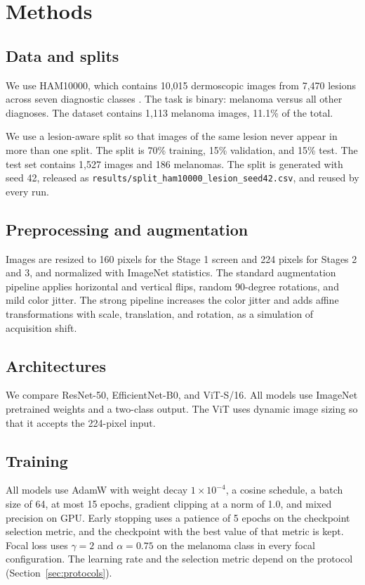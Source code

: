 \section{Methods}

\subsection{Data and splits}

We use HAM10000, which contains 10,015 dermoscopic images from 7,470 lesions across seven diagnostic classes \citep{tschandl2018ham10000}. The task is binary: melanoma versus all other diagnoses. The dataset contains 1,113 melanoma images, 11.1\% of the total.

We use a lesion-aware split so that images of the same lesion never appear in more than one split. The split is 70\% training, 15\% validation, and 15\% test. The test set contains 1,527 images and 186 melanomas. The split is generated with seed 42, released as \texttt{results/split\_ham10000\_lesion\_seed42.csv}, and reused by every run.

\subsection{Preprocessing and augmentation}

Images are resized to 160 pixels for the Stage 1 screen and 224 pixels for Stages 2 and 3, and normalized with ImageNet statistics. The standard augmentation pipeline applies horizontal and vertical flips, random 90-degree rotations, and mild color jitter. The strong pipeline increases the color jitter and adds affine transformations with scale, translation, and rotation, as a simulation of acquisition shift.

\subsection{Architectures}

We compare ResNet-50, EfficientNet-B0, and ViT-S/16. All models use ImageNet pretrained weights and a two-class output. The ViT uses dynamic image sizing so that it accepts the 224-pixel input.

\subsection{Training}

All models use AdamW with weight decay $1\times10^{-4}$, a cosine schedule, a batch size of 64, at most 15 epochs, gradient clipping at a norm of 1.0, and mixed precision on GPU. Early stopping uses a patience of 5 epochs on the checkpoint selection metric, and the checkpoint with the best value of that metric is kept. Focal loss uses $\gamma=2$ and $\alpha=0.75$ on the melanoma class in every focal configuration. The learning rate and the selection metric depend on the protocol (Section~\ref{sec:protocols}).

